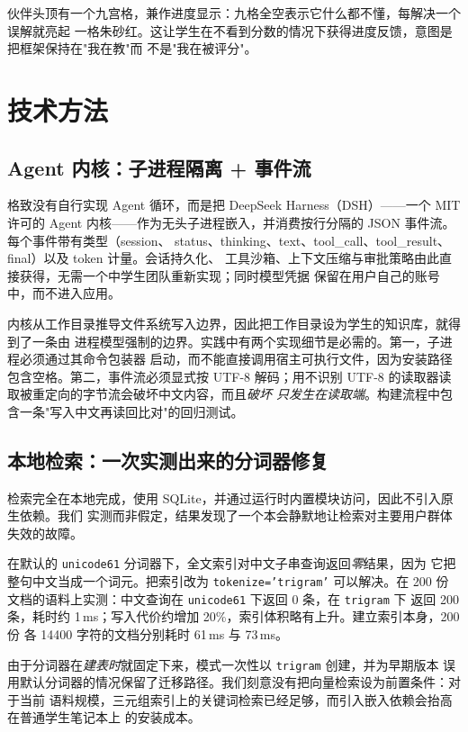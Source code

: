 \documentclass[11pt,a4paper,UTF8,fontset=windows]{ctexart}
\begin{document}
伙伴头顶有一个九宫格，兼作进度显示：九格全空表示它什么都不懂，每解决一个误解就亮起
一格朱砂红。这让学生在不看到分数的情况下获得进度反馈，意图是把框架保持在"我在教"而
不是"我在被评分"。

\section{技术方法}

\subsection{Agent 内核：子进程隔离 + 事件流}

格致没有自行实现 Agent 循环，而是把 DeepSeek Harness（DSH）——一个 MIT 许可的 Agent
内核——作为无头子进程嵌入，并消费按行分隔的 JSON 事件流。每个事件带有类型（session、
status、thinking、text、tool\_call、tool\_result、final）以及 token 计量。会话持久化、
工具沙箱、上下文压缩与审批策略由此直接获得，无需一个中学生团队重新实现；同时模型凭据
保留在用户自己的账号中，而不进入应用。

内核从工作目录推导文件系统写入边界，因此把工作目录设为学生的知识库，就得到了一条由
进程模型强制的边界。实践中有两个实现细节是必需的。第一，子进程必须通过其命令包装器
启动，而不能直接调用宿主可执行文件，因为安装路径包含空格。第二，事件流必须显式按
UTF-8 解码；用不识别 UTF-8 的读取器读取被重定向的字节流会破坏中文内容，而且\emph{破坏
只发生在读取端}。构建流程中包含一条"写入中文再读回比对"的回归测试。

\subsection{本地检索：一次实测出来的分词器修复}

检索完全在本地完成，使用 SQLite，并通过运行时内置模块访问，因此不引入原生依赖。我们
实测而非假定，结果发现了一个本会静默地让检索对主要用户群体失效的故障。

在默认的 \texttt{unicode61} 分词器下，全文索引对中文子串查询返回\emph{零}结果，因为
它把整句中文当成一个词元。把索引改为 \texttt{tokenize='trigram'} 可以解决。在 200 份
文档的语料上实测：中文查询在 \texttt{unicode61} 下返回 0 条，在 \texttt{trigram} 下
返回 200 条，耗时约 1\,ms；写入代价约增加 20\%，索引体积略有上升。建立索引本身，200 份
各 14400 字符的文档分别耗时 61\,ms 与 73\,ms。

由于分词器在\emph{建表时}就固定下来，模式一次性以 \texttt{trigram} 创建，并为早期版本
误用默认分词器的情况保留了迁移路径。我们刻意没有把向量检索设为前置条件：对于当前
语料规模，三元组索引上的关键词检索已经足够，而引入嵌入依赖会抬高在普通学生笔记本上
的安装成本。
\end{document}
